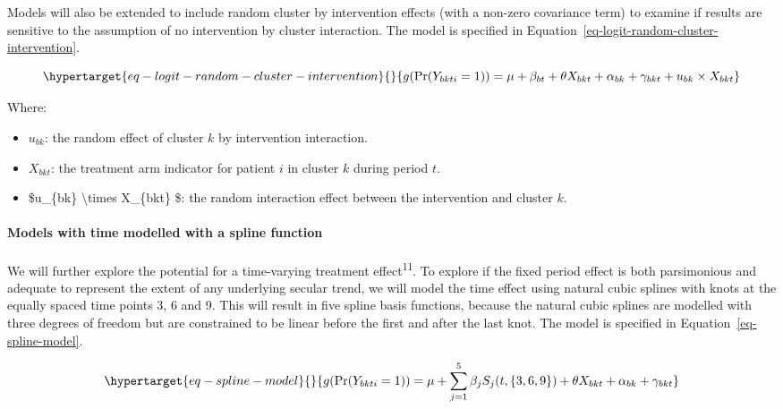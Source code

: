\documentclass[
]{scrartcl}
\let\oldparagraph\paragraph
\renewcommand{\paragraph}[1]{\oldparagraph{#1}\mbox{}}
\providecommand{\tightlist}{%
  \setlength{\itemsep}{0pt}\setlength{\parskip}{0pt}}\usepackage{longtable,booktabs,array}
\begin{document}
Models will also be extended to include random cluster by intervention
effects (with a non-zero covariance term) to examine if results are
sensitive to the assumption of no intervention by cluster interaction.
The model is specified in
Equation~\ref{eq-logit-random-cluster-intervention}.

\begin{equation}\protect\hypertarget{eq-logit-random-cluster-intervention}{}{
g(\text{Pr}(Y_{bkti} = 1)) = \mu + \beta_{bt} + \theta X_{bkt} + \alpha_{bk} + \gamma_{bkt} + u_{bk} \times X_{bkt}
}\label{eq-logit-random-cluster-intervention}\end{equation}

Where:

\begin{itemize}
\tightlist
\item
  \(u_{bk}\): the random effect of cluster \(k\) by intervention
  interaction.
\item
  \(X_{bkt}\): the treatment arm indicator for patient \(i\) in cluster
  \(k\) during period \(t\).
\item
  \$u\_\{bk\} \textbackslash times X\_\{bkt\} \$: the random interaction
  effect between the intervention and cluster \(k\).
\end{itemize}

\hypertarget{models-with-time-modelled-with-a-spline-function}{%
\paragraph{Models with time modelled with a spline
function}\label{models-with-time-modelled-with-a-spline-function}}

We will further explore the potential for a time-varying treatment
effect\textsuperscript{11}. To explore if the fixed period effect is
both parsimonious and adequate to represent the extent of any underlying
secular trend, we will model the time effect using natural cubic splines
with knots at the equally spaced time points 3, 6 and 9. This will
result in five spline basis functions, because the natural cubic splines
are modelled with three degrees of freedom but are constrained to be
linear before the first and after the last knot. The model is specified
in Equation~\ref{eq-spline-model}.

\begin{equation}\protect\hypertarget{eq-spline-model}{}{
g(\text{Pr}(Y_{bkti} = 1)) = \mu + \sum_{j=1}^5 \beta_j S_j(t, \{3, 6, 9\}) + \theta X_{bkt} + \alpha_{bk} + \gamma_{bkt}
}\label{eq-spline-model}\end{equation}
\end{document}
